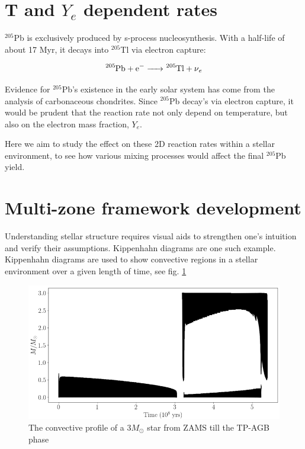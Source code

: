 \documentclass{article}
\begin{document}
\section*{T and $Y_{e}$ dependent rates}

$^{205}$Pb is exclusively produced by s-process nucleosynthesis. With a half-life of about 17 Myr, it decays into $^{205}$Tl via 
electron capture:

\begin{align*}
    \ce{^205Pb + e^- -> ^205Tl + \nu_{e}}
\end{align*}

Evidence for $^{205}$Pb's existence in the early solar system has come from the analysis of carbonaceous chondrites\cite{baker2010thallium}. 
Since $^{205}$Pb decay's via electron capture, it would be prudent that the reaction rate not only depend on temperature, but also on 
the electron mass fraction, $Y_{e}$.

Here we aim to study the effect on these 2D reaction rates within a stellar environment, to see how various mixing processes would affect 
the final $^{205}$Pb yield.

\section*{Multi-zone framework development}

Understanding stellar structure requires visual aids to strengthen one's intuition and verify their assumptions. Kippenhahn diagrams 
are one such example. Kippenhahn diagrams are used to show convective regions in a stellar environment over a given length of time, see
fig. \ref{conv}

\begin{figure}[H]
    \centerline{\includegraphics[scale = 0.5]{images/conv.png}}
    \caption{The convective profile of a 3$M_{\odot}$ star from ZAMS till the TP-AGB phase}
    \label{conv}
\end{figure}
\end{document}
